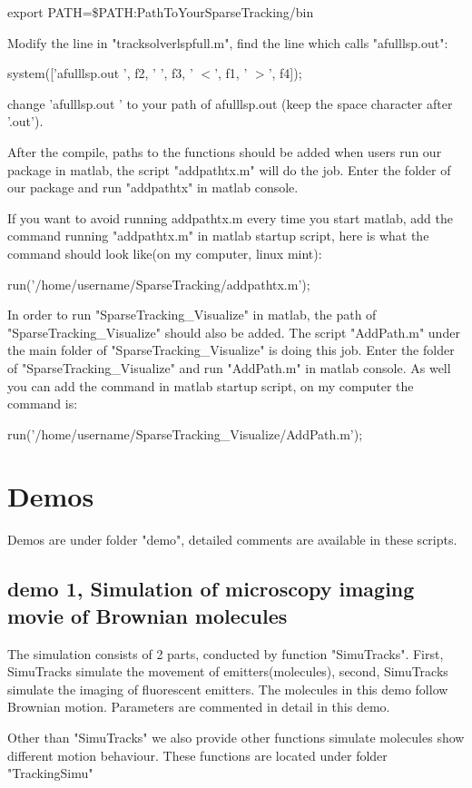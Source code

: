 \documentclass[a4paper]{article}
\begin{document}
\begin{CJK*}{UTF8}{kai}
export PATH=\$PATH:PathToYourSparseTracking/bin

Modify the line in "tracksolverlspfull.m", find the line which calls "afulllsp.out": 

system(['afulllsp.out ', f2, ' ', f3, ' $<$', f1, ' $>$', f4]); 

change 'afulllsp.out ' to your path of afulllsp.out (keep the space character after '.out').

After the compile, paths to the functions should be added when users run our package in matlab, the script "addpathtx.m" will do the job. 
Enter the folder of our package and run "addpathtx" in matlab console.

If you want to avoid running addpathtx.m every time you start matlab, add the command running "addpathtx.m" in matlab startup script, here is what the command should look like(on my computer, linux mint):

run('/home/username/SparseTracking/addpathtx.m');

In order to run "SparseTracking\_Visualize" in matlab, the path of "SparseTracking\_Visualize" should also be added.
The script "AddPath.m" under the main folder of "SparseTracking\_Visualize" is doing this job.
Enter the folder of "SparseTracking\_Visualize" and run "AddPath.m" in matlab console.
As well you can add the command in matlab startup script, on my computer the command is:

run('/home/username/SparseTracking\_Visualize/AddPath.m');

\section{Demos}
Demos are under folder "demo", detailed comments are available in these scripts.

\subsection{demo 1, Simulation of microscopy imaging movie of Brownian molecules}
The simulation consists of 2 parts, conducted by function "SimuTracks". First, SimuTracks simulate the movement of emitters(molecules), second, SimuTracks simulate the imaging of fluorescent emitters. The molecules in this demo follow Brownian motion. Parameters are commented in detail in this demo.

Other than "SimuTracks" we also provide other functions simulate molecules show different motion behaviour. These functions are located under folder "TrackingSimu"


\end{CJK*}
\end{document}
